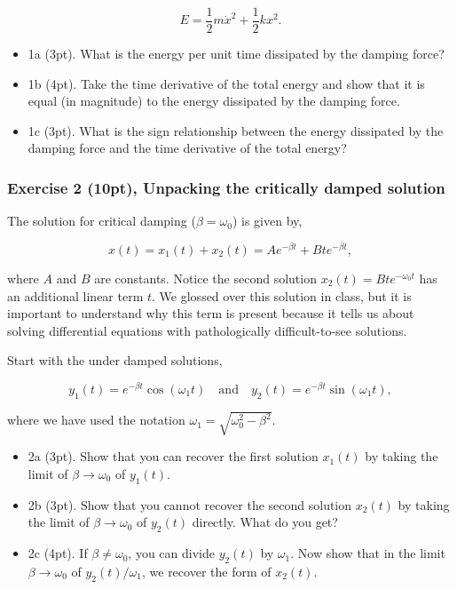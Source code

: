 \documentclass[11pt]{article}
\providecommand{\tightlist}{%
      \setlength{\itemsep}{0pt}\setlength{\parskip}{0pt}}
\begin{document}
\[E = \frac{1}{2}m\dot{x}^2 + \frac{1}{2}kx^2.\]

\begin{itemize}
\tightlist
\item
  1a (3pt). What is the energy per unit time dissipated by the damping
  force?
\item
  1b (4pt). Take the time derivative of the total energy and show that
  it is equal (in magnitude) to the energy dissipated by the damping
  force.
\item
  1c (3pt). What is the sign relationship between the energy dissipated
  by the damping force and the time derivative of the total energy?
\end{itemize}

    \subsubsection{Exercise 2 (10pt), Unpacking the critically damped
solution}\label{exercise-2-10pt-unpacking-the-critically-damped-solution}

The solution for critical damping (\(\beta = \omega_0\)) is given by,

\[x(t) = x_1(t) + x_2(t) = Ae^{-\beta t} + Bte^{-\beta t},\]

where \(A\) and \(B\) are constants. Notice the second solution
\(x_2(t) = Bte^{-\omega_0t}\) has an additional linear term \(t\). We
glossed over this solution in class, but it is important to understand
why this term is present because it tells us about solving differential
equations with pathologically difficult-to-see solutions.

Start with the under damped solutions,

\[y_1(t) = e^{-\beta t}\cos(\omega_1 t) \quad \text{and} \quad y_2(t) = e^{-\beta t}\sin(\omega_1 t),\]

where we have used the notation
\(\omega_1 = \sqrt{\omega_0^2 - \beta^2}\).

\begin{itemize}
\tightlist
\item
  2a (3pt). Show that you can recover the first solution \(x_1(t)\) by
  taking the limit of \(\beta \rightarrow \omega_0\) of \(y_1(t)\).
\item
  2b (3pt). Show that you cannot recover the second solution \(x_2(t)\)
  by taking the limit of \(\beta \rightarrow \omega_0\) of \(y_2(t)\)
  directly. What do you get?
\item
  2c (4pt). If \(\beta \neq \omega_0\), you can divide \(y_2(t)\) by
  \(\omega_1\). Now show that in the limit
  \(\beta \rightarrow \omega_0\) of \(y_2(t)/\omega_1\), we recover the
  form of \(x_2(t)\).
\end{itemize}
\end{document}
